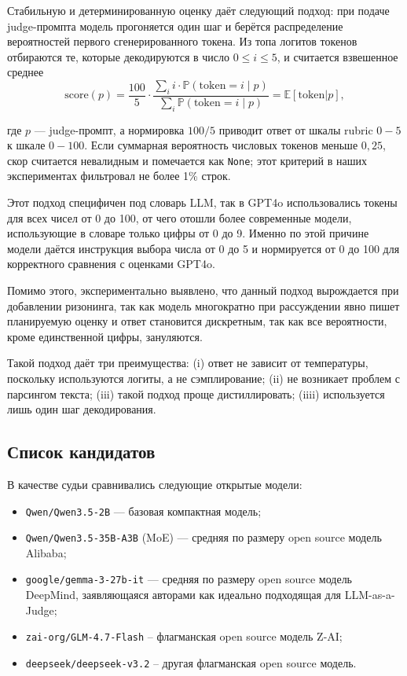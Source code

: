 \documentclass[a4paper,12pt]{extarticle}
\begin{document}
Стабильную и детерминированную оценку даёт следующий подход: при подаче judge-промпта модель прогоняется один шаг и берётся распределение вероятностей первого сгенерированного токена. Из топа логитов токенов отбираются те, которые декодируются в число $0 \le i \le 5$, и считается взвешенное среднее
\begin{equation}
    \label{eq:score}
    \mathrm{score}(p) = \frac{100}{5} \cdot \frac{\sum_{i} i \cdot \mathbb{P}(\text{token}\!=\!i \mid p)}{\sum_{i} \mathbb{P}(\text{token}\!=\!i \mid p)} = \mathbb{E}[\text{token} | p],
\end{equation}

где $p$ — judge-промпт, а нормировка $100/5$ приводит ответ от шкалы rubric $0\!-\!5$ к шкале $0\!-\!100$. Если суммарная вероятность числовых токенов меньше $0{,}25$, скор считается невалидным и помечается как \texttt{None}; этот критерий в наших экспериментах фильтровал не более 1\% строк. 

Этот подход специфичен под словарь LLM, так в GPT4o использовались токены для всех чисел от 0 до 100, от чего отошли более современные модели, использующие в словаре только цифры от 0 до 9. Именно по этой причине модели даётся инструкция выбора числа от 0 до 5 и нормируется от 0 до 100 для корректного сравнения с оценками GPT4o. 

Помимо этого, экспериментально выявлено, что данный подход вырождается при добавлении ризонинга, так как модель многократно при рассуждении явно пишет планируемую оценку и ответ становится дискретным, так как все вероятности, кроме единственной цифры, зануляются.

Такой подход даёт три преимущества: (i) ответ не зависит от температуры, поскольку используются логиты, а не сэмплирование; (ii) не возникает проблем с парсингом текста; (iii) такой подход проще дистиллировать; (iiii) используется лишь один шаг декодирования.

\subsection{Список кандидатов}

В качестве судьи сравнивались следующие открытые модели:
\begin{itemize}
    \item \texttt{Qwen/Qwen3.5-2B} — базовая компактная модель;
    \item \texttt{Qwen/Qwen3.5-35B-A3B} (MoE) — средняя по размеру open source модель Alibaba;
    \item \texttt{google/gemma-3-27b-it} — средняя по размеру open source модель DeepMind, заявляющаяся авторами как идеально подходящая для LLM-as-a-Judge;
    \item \texttt{zai-org/GLM-4.7-Flash} -- флагманская open source модель Z-AI;
    \item \texttt{deepseek/deepseek-v3.2} -- другая флагманская open source модель.
\end{itemize}
\end{document}
